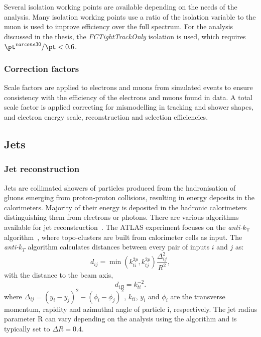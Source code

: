 Several isolation working points are available depending on the needs of the analysis. Many isolation working points use a ratio of the isolation variable to the muon \pt is used to improve efficiency over the full \pt spectrum. For the analysis discussed in the thesis, the \emph{FCTightTrackOnly} isolation is used, which requires $\pt^{varcone30}/\pt < 0.6$. 

\subsubsection{Correction factors}

Scale factors are applied to electrons and muons from simulated events to ensure consistency with the efficiency of the electrons and muons found in data. A total scale factor is applied correcting for mismodelling in tracking and shower shapes, and electron energy scale, reconstruction and selection efficiencies.

\subsection{Jets}

\subsubsection{Jet reconstruction}
Jets are collimated showers of particles produced from the hadronisation of gluons emerging from proton-proton collisions, resulting in energy deposits in the calorimeters. Majority of their energy is deposited in the hadronic calorimeters distinguishing them from electrons or photons. There are various algorithms available for jet reconstruction~\cite{Atkin_2015}. The ATLAS experiment focuses on the \emph{anti-$k_\text{T}$} algorithm~\cite{antikt}, where topo-clusters are built from calorimeter cells as input. The \emph{anti-$k_T$} algorithm calculates distances between every pair of inputs $i$ and $j$ as:
\begin{equation}
    d_{ij} = \min\!\left(k_{ti}^{2p}, k_{tj}^{2p}\right) \frac{\Delta^2_{ij}}{R^2}, 
\end{equation}
with the distance to the beam axis,
\begin{equation}
    d_{iB} = k_{ti}^{-2}.
\end{equation}
where $\Delta_{ij} = (y_i - y_j)^2 - (\phi_i - \phi_j)^2$, $k_{ti}$, $y_i$ and $\phi_i$ are the transverse momentum, rapidity and azimuthal angle of particle i, respectively. The jet radius parameter R can vary depending on the analysis using the algorithm and is typically set to $\Delta R = 0.4$. 

